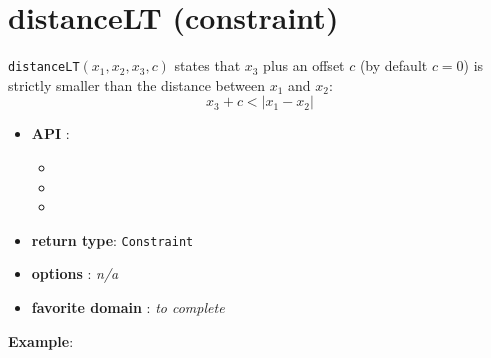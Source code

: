 \label{distancelt}
\hypertarget{distancelt}{}

\section{distanceLT (constraint)}\label{distancelt:distanceltconstraint}\hypertarget{distancelt:distanceltconstraint}{}
\begin{notedef}
  \texttt{distanceLT}$(x_1,x_2,x_3,c)$ states that $x_3$ plus an offset $c$ (by default $c=0$) is strictly smaller than the distance between $x_1$ and $x_2$:
$$ x_3 + c < | x_1 - x_2 |$$
\end{notedef}

\begin{itemize}
	\item \textbf{API} :
	\begin{itemize}
		\item {}
		\item {}
		\item {}
	\end{itemize}
	\item \textbf{return type}: \texttt{Constraint}
	\item \textbf{options} : \emph{n/a}
	\item \textbf{favorite domain} : \emph{to complete}
\end{itemize}

\textbf{Example}:

